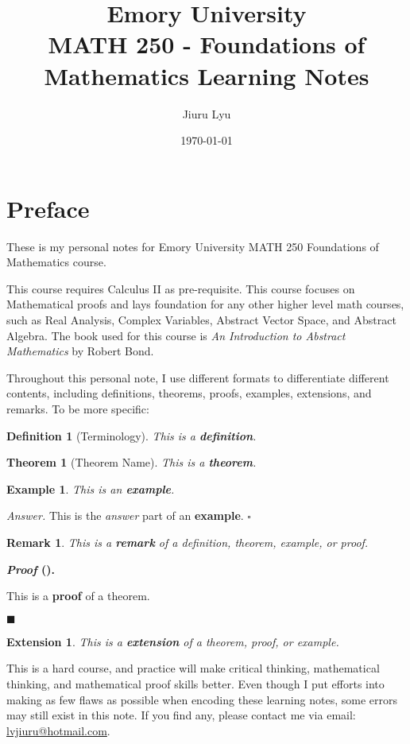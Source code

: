 \documentclass[12pt,a4paper]{article}
\title{Emory University\\\textbf{MATH 250 - Foundations of Mathematics Learning Notes}}
\author{Jiuru Lyu}
\date{\today}
\newtheorem{thm}{Theorem}[subsection]
\newtheorem{df}{Definition}[subsection]
\newtheorem{eg}{Example}[subsection]
\newcounter{nprf}[subsection]
\newenvironment*{ans}{\par{\textit{Answer. }}}{\hfill{$\square$}\par}
\newtheorem*{rmk}{\indent Remark}
\newenvironment*{prf}{\par\indent\textbf{\textit{Proof} (\stepcounter{nprf}\thenprf). }\par }{\par\hfill $\blacksquare$\par}
\newtheorem*{ext}{\indent Extension}
\begin{document}
\maketitle
\tableofcontents
\newpage

\section*{Preface}
These is my personal notes for Emory University MATH 250 Foundations of Mathematics course. 

This course requires Calculus II as pre-requisite. This course focuses on Mathematical proofs and lays foundation for any other higher level math courses, such as Real Analysis, Complex Variables, Abstract Vector Space, and Abstract Algebra. The book used for this course is \textit{An Introduction to Abstract Mathematics} by Robert Bond. 

Throughout this personal note, I use different formats to differentiate different contents, including definitions, theorems, proofs, examples, extensions, and remarks. To be more specific: 
\begin{df}[Terminology]
    This is a \textbf{definition}.	
\end{df}
\begin{thm}[Theorem Name]
    This is a \textbf{theorem}.	
\end{thm}
\begin{eg}
    This is  an \textbf{example}. 
\end{eg}

\begin{ans}
    This is the \textit{answer} part of an \textbf{example}. 
\end{ans}
\begin{rmk}
	This is a \textbf{remark} of a definition, theorem, example, or proof. 
\end{rmk}

\begin{prf}
	This is a \textbf{proof} of a theorem. 
\end{prf}
\begin{ext}
	This is a \textbf{extension} of a theorem, proof, or example. 	
\end{ext}
This is a hard course, and practice will make critical thinking, mathematical thinking, and mathematical proof skills better. Even though I put efforts into making as few flaws as possible when encoding these learning notes, some errors may still exist in this note. If you find any, please contact me via email: \url{lvjiuru@hotmail.com}. 
\end{document}
